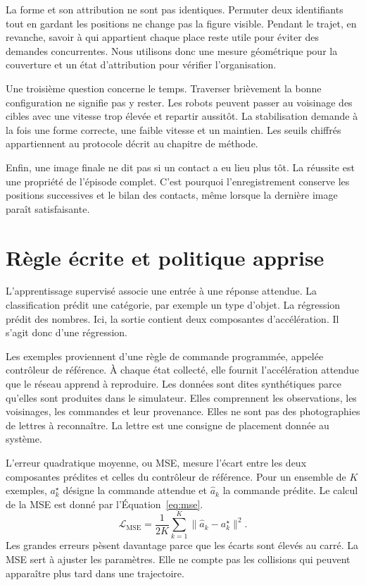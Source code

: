 La forme et son attribution ne sont pas identiques. Permuter deux identifiants tout en gardant les positions ne change pas la figure visible. Pendant le trajet, en revanche, savoir à qui appartient chaque place reste utile pour éviter des demandes concurrentes. Nous utilisons donc une mesure géométrique pour la couverture et un état d'attribution pour vérifier l'organisation.

Une troisième question concerne le temps. Traverser brièvement la bonne configuration ne signifie pas y rester. Les robots peuvent passer au voisinage des cibles avec une vitesse trop élevée et repartir aussitôt. La stabilisation demande à la fois une forme correcte, une faible vitesse et un maintien. Les seuils chiffrés appartiennent au protocole décrit au chapitre de méthode.

Enfin, une image finale ne dit pas si un contact a eu lieu plus tôt. La réussite est une propriété de l'épisode complet. C'est pourquoi l'enregistrement conserve les positions successives et le bilan des contacts, même lorsque la dernière image paraît satisfaisante.

\section{Règle écrite et politique apprise}
L'apprentissage supervisé associe une entrée à une réponse attendue. La classification prédit une catégorie, par exemple un type d'objet. La régression prédit des nombres. Ici, la sortie contient deux composantes d'accélération. Il s'agit donc d'une régression.

Les exemples proviennent d'une règle de commande programmée, appelée contrôleur de référence. À chaque état collecté, elle fournit l'accélération attendue que le réseau apprend à reproduire. Les données sont dites synthétiques parce qu'elles sont produites dans le simulateur. Elles comprennent les observations, les voisinages, les commandes et leur provenance. Elles ne sont pas des photographies de lettres à reconnaître. La lettre est une consigne de placement donnée au système.

L'erreur quadratique moyenne, ou MSE, mesure l'écart entre les deux composantes prédites et celles du contrôleur de référence.
Pour un ensemble de $K$ exemples, $a_k^\star$ désigne la commande attendue et $\widehat a_k$ la commande prédite. Le calcul de la MSE est donné par l'Équation~\eqref{eq:mse}.
\begin{equation}
\mathcal{L}_{\mathrm{MSE}}=\frac{1}{2K}\sum_{k=1}^{K}\|\widehat a_k-a_k^\star\|^2.
\label{eq:mse}
\end{equation}
Les grandes erreurs pèsent davantage parce que les écarts sont élevés au carré. La MSE sert à ajuster les paramètres. Elle ne compte pas les collisions qui peuvent apparaître plus tard dans une trajectoire.

